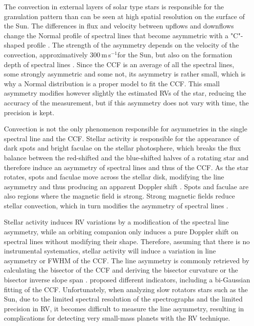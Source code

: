 \documentclass[11pt, oneside]{article}
\def\ms{\hbox{\,m\,s$^{-1}$}}         %
\begin{document}
The convection in external layers of solar type stars is responsible for the granulation pattern than can be seen at high spatial resolution on the surface of the Sun. The differences in flux and velocity between upflows and downflows change the Normal profile of spectral lines that become asymmetric with a "C"-shaped profile \citep[][]{Dravins-1981}. The strength of the asymmetry depends on the velocity of the convection, approximatively 300\ms for the Sun, but also on the formation depth of spectral lines \citep{Gray-2009}. Since the CCF is an average of all the spectral lines, some strongly asymmetric and some not, its asymmetry is rather small, which is why a Normal distribution is a proper model to fit the CCF. This small asymmetry modifies however slightly the estimated RVs of the star, reducing the accuracy of the measurement, but if this asymmetry does not vary with time, the precision is kept.

Convection is not the only phenomenon responsible for asymmetries in the single spectral line and the CCF. Stellar activity is responsible for the appearance of dark spots and bright faculae on the stellar photosphere, which breaks the flux balance between the red-shifted and the blue-shifted halves of a rotating star and therefore induce an asymmetry of spectral lines and thus of the CCF. As the star rotates, spots and faculae move across the stellar disk, modifying the line asymmetry and thus producing an apparent Doppler shift \citep{Saar-1997b,Hatzes-2002,Kurster2003,Desort-2007,Lagrange-2010,Boisse-2012b}. Spots and faculae are also regions where the magnetic field is strong. Strong magnetic fields reduce stellar convection, which in turn modifies the asymmetry of spectral lines \citep[][]{Cavallini-1985a,Dravins-1981,Lindegren-2003,Meunier-2010a,Dumusque-2014b}.

Stellar activity induces RV variations by a modification of the spectral line asymmetry, while an orbiting companion only induces a pure Doppler shift on spectral lines without modifying their shape.
Therefore, assuming that there is no instrumental systematics, stellar activity will induce a variation in line asymmetry or FWHM of the CCF. The line asymmetry is commonly retrieved by calculating the bisector of the CCF \citep[][]{Voigt1956} and deriving the bisector curvature \citep[][]{Hatzes1996} or the bisector inverse slope span \citep[BIS SPAN,][]{Queloz-2001}. \citet{Figueira-2013} proposed different indicators, including a bi-Gaussian fitting of the CCF. Unfortunately, when analyzing slow rotators stars such as the Sun, due to the limited spectral resolution of the spectrographs and the limited precision in RV, it becomes difficult to measure the line asymmetry, resulting in complications for detecting very small-mass planets with the RV technique.
\end{document}
